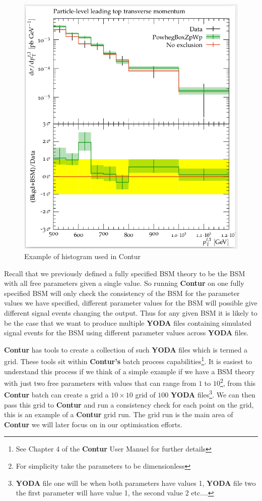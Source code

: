 \begin{figure}[H]
\centering
\includegraphics[scale=0.3]{plots/example_histogram.png}
\caption{Example of histogram used in Contur}
\label{fig:example_histogram}
\end{figure}

Recall that we previously defined a fully specified BSM theory to be the BSM with all free parameters given a single value. So running \textbf{Contur} on one fully specified BSM will only check the consistency of the BSM for the parameter values we have specified, different parameter values for the BSM will possible give different signal events changing the output. Thus for any given BSM it is likely to be the case that we want to produce multiple \textbf{YODA} files containing simulated signal events for the BSM using different parameter values across \textbf{YODA} files. 

\textbf{Contur} has tools to create a collection of such \textbf{YODA} files which is termed a grid. These tools sit within \textbf{Contur's} batch process capabilities\footnote{See Chapter 4 of the \textbf{Contur} User Manuel\cite{contur_manuel} for further details}. It is easiest to understand this process if we think of a simple example if we have a BSM theory with just two free parameters with values that can range from $1$ to $10$\footnote{For simplicity take the parameters to be dimensionless}, from this \textbf{Contur} batch can create a grid a $10\times 10$ grid of $100$ \textbf{YODA} files\footnote{\textbf{YODA} file one will be when both parameters have values 1, \textbf{YODA} file two the first parameter will have value 1, the second value 2 etc....}. We can then pass this grid to \textbf{Contur} and run a consistency check for each point on the grid, this is an example of a \textbf{Contur} grid run. The grid run is the main area of \textbf{Contur} we will later focus on in our optimisation efforts.

